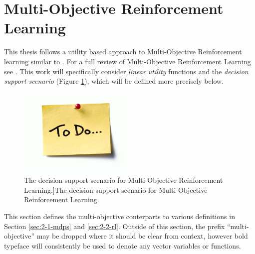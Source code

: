 \section{Multi-Objective Reinforcement Learning}
\label{sec:2-5-morl}





    This thesis follows a utility based approach to Multi-Objective Reinforcement learning similar to . For a full review of Multi-Objective Reinforcement Learning see . This work will specifically consider \textit{linear utility} functions and the \textit{decision support scenario} (Figure \ref{fig:mo_decision_support}), which will be defined more precisely below.

    \begin{figure}
        \centering\includegraphics[width=0.5\textwidth]{figures/todo.jpg} 
        \caption{The decision-support scenario for Multi-Objective Reinforcement Learning.]{The decision-support scenario for Multi-Objective Reinforcement Learning.}}
        \label{fig:mo_decision_support}
    \end{figure}

    This section defines the multi-objective conterparts to various definitions in Section \ref{sec:2-1-mdps} and \ref{sec:2-2-rl}. Outside of this section, the prefix ``multi-objective'' may be dropped where it should be clear from context, however bold typeface will consistently be used to denote any vector variables or functions.

